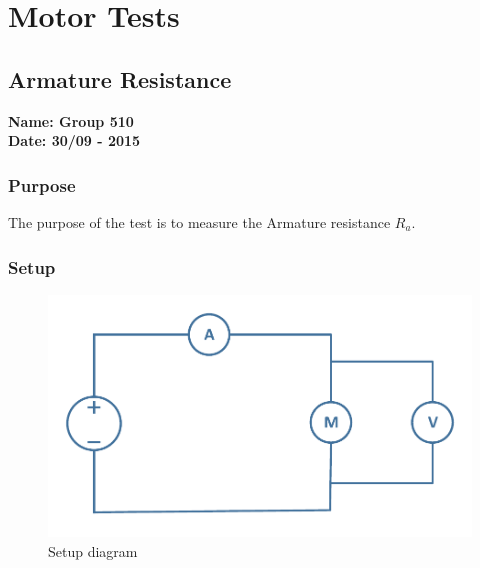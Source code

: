 \pagebreak
\section{Motor Tests}
\nopagebreak
\subsection{Armature Resistance} %
\textbf{Name: Group 510}\\
\textbf{Date: 30/09 - 2015}

\subsubsection{Purpose}
The purpose of the test is to measure the Armature resistance $R_a$.

\subsubsection{Setup}
\begin{figure}[H]
  \centering
	\includegraphics[scale=0.5]{figures/MotorTest1.pdf}
	\caption{Setup diagram}
\end{figure}

